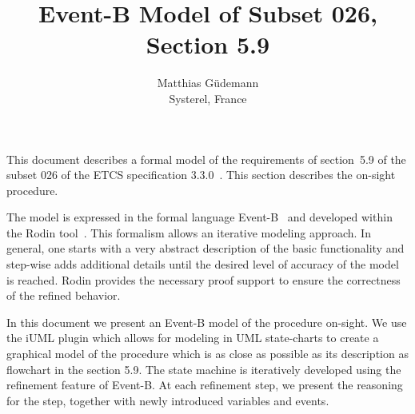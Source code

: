 \documentclass{template/openetcs_article}
\begin{document}
\frontmatter
{}





\newcommand{\true}{\ensuremath{true}}
\newcommand{\btext}[1]{{\it #1}}
\newcommand{\bvar}[1]{\btext{#1}}
\newcommand{\bevent}[1]{\btext{#1}}
\newcommand{\binv}[1]{\btext{#1}}
\newcommand{\bconst}[1]{\btext{#1}}
\newcommand{\bparam}[1]{\btext{#1}}
\newcommand{\bfunc}[1]{\btext{#1}}
\newcommand{\baxiom}[1]{\btext{#1}}
\newcommand{\btype}[1]{\btext{#1}}
\newcommand{\bguard}[1]{\btext{#1}}
\newcommand{\bmachine}[1]{\btext{#1}}
\newcommand{\bctx}[1]{\btext{#1}}

\author{Matthias Güdemann\\Systerel, France}


\title{Event-B Model of Subset 026, Section 5.9}




\maketitle
\tableofcontents
\listoffiguresandtables
\newpage

This document describes a formal model of the requirements of section~5.9 of
the subset 026 of the ETCS specification 3.3.0~\cite{SRS-026-330}. This section
describes the on-sight procedure.

The model is expressed in the formal language Event-B~\cite{abrial-eventB-Book}
and developed within the Rodin tool~\cite{rodin-handbook}. This formalism allows
an iterative modeling approach. In general, one starts with a very abstract
description of the basic functionality and step-wise adds additional details
until the desired level of accuracy of the model is reached. Rodin provides the
necessary proof support to ensure the correctness of the refined behavior.

In this document we present an Event-B model of the procedure on-sight. We use
the iUML plugin which allows for modeling in UML state-charts to create a
graphical model of the procedure which is as close as possible as its
description as flowchart in the section 5.9. The state machine is iteratively
developed using the refinement feature of Event-B. At each refinement step, we
present the reasoning for the step, together with newly introduced variables and
events.
\end{document}
